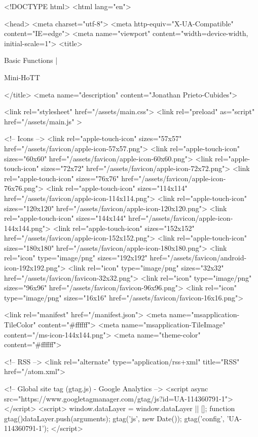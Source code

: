 <!DOCTYPE html>
<html lang="en">

<head>
  <meta charset="utf-8">
  <meta http-equiv="X-UA-Compatible" content="IE=edge">
  <meta name="viewport" content="width=device-width, initial-scale=1">
  <title>
    
      
        Basic Functions |
      
        Mini-HoTT
    
  </title>
  <meta name="description" content="Jonathan Prieto-Cubides">

  <link rel="stylesheet" href="/assets/main.css">
  <link rel="preload" as="script" href="/assets/main.js" >

  <!-- Icons -->
  <link rel="apple-touch-icon" sizes="57x57" href="/assets/favicon/apple-icon-57x57.png">
  <link rel="apple-touch-icon" sizes="60x60" href="/assets/favicon/apple-icon-60x60.png">
  <link rel="apple-touch-icon" sizes="72x72" href="/assets/favicon/apple-icon-72x72.png">
  <link rel="apple-touch-icon" sizes="76x76" href="/assets/favicon/apple-icon-76x76.png">
  <link rel="apple-touch-icon" sizes="114x114" href="/assets/favicon/apple-icon-114x114.png">
  <link rel="apple-touch-icon" sizes="120x120" href="/assets/favicon/apple-icon-120x120.png">
  <link rel="apple-touch-icon" sizes="144x144" href="/assets/favicon/apple-icon-144x144.png">
  <link rel="apple-touch-icon" sizes="152x152" href="/assets/favicon/apple-icon-152x152.png">
  <link rel="apple-touch-icon" sizes="180x180" href="/assets/favicon/apple-icon-180x180.png">
  <link rel="icon" type="image/png" sizes="192x192"  href="/assets/favicon/android-icon-192x192.png">
  <link rel="icon" type="image/png" sizes="32x32" href="/assets/favicon/favicon-32x32.png">
  <link rel="icon" type="image/png" sizes="96x96" href="/assets/favicon/favicon-96x96.png">
  <link rel="icon" type="image/png" sizes="16x16" href="/assets/favicon/favicon-16x16.png">

  <link rel="manifest" href="/manifest.json">
  <meta name="msapplication-TileColor" content="#ffffff">
  <meta name="msapplication-TileImage" content="/ms-icon-144x144.png">
  <meta name="theme-color" content="#ffffff">

  <!-- RSS -->
  <link rel="alternate" type="application/rss+xml" title="RSS" href="/atom.xml">

  <!-- Global site tag (gtag.js) - Google Analytics -->
  <script async src="https://www.googletagmanager.com/gtag/js?id=UA-114360791-1"></script>
  <script>
    window.dataLayer = window.dataLayer || [];
    function gtag(){dataLayer.push(arguments);}
    gtag('js', new Date());
    gtag('config', 'UA-114360791-1');
  </script>


